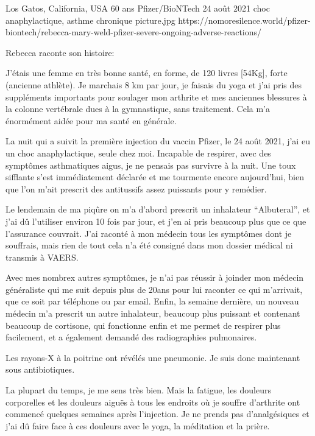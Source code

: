 {Los Gatos, California, USA}
{60 ans}
{Pfizer/BioNTech}
{24 août 2021}
{choc anaphylactique, asthme chronique}
{picture.jpg}
{https://nomoresilence.world/pfizer-biontech/rebecca-mary-weld-pfizer-severe-ongoing-adverse-reactions/}
{

\normalsize
  
Rebecca raconte son histoire:

J'étais une femme en très bonne santé, en forme, de 120 livres [54Kg], forte
(ancienne athlète). Je marchais 8 km par jour, je faisais du yoga et j'ai pris
des suppléments importants pour soulager mon arthrite et mes anciennes blessures
à la colonne vertébrale dues à la gymnastique, sans traitement. Cela m'a
énormément aidée pour ma santé en générale.

La nuit qui a suivit la première injection du vaccin Pfizer, le 24 août 2021,
j'ai eu un choc anaphylactique, seule chez moi. Incapable de respirer, avec des
symptômes asthmatiques aigus, je ne pensais pas survivre à la nuit. Une toux
sifflante s'est immédiatement déclarée et me tourmente encore aujourd'hui, bien
que l'on m'ait prescrit des antitussifs assez puissants pour y remédier.

Le lendemain de ma piqûre on m'a d'abord prescrit un inhalateur “Albuteral”, et
j'ai dû l'utiliser environ 10 fois par jour, et j'en ai pris beaucoup plus que
ce que l'assurance couvrait. J'ai raconté à mon médecin tous les symptômes dont
je souffrais, mais rien de tout cela n'a été consigné dans mon dossier médical
ni transmis à VAERS.

Avec mes nombrex autres symptômes, je n'ai pas réussir à joinder mon médecin
généraliste qui me suit depuis plus de 20ans pour lui raconter ce qui
m'arrivait, que ce soit par téléphone ou par email. Enfin, la semaine dernière,
un nouveau médecin m'a prescrit un autre inhalateur, beaucoup plus puissant et
contenant beaucoup de cortisone, qui fonctionne enfin et me permet de respirer
plus facilement, et a également demandé des radiographies pulmonaires.

Les rayons-X à la poitrine ont révélés une pneumonie. Je suis donc maintenant
sous antibiotiques.

La plupart du temps, je me sens très bien. Mais la fatigue, les douleurs
corporelles et les douleurs aiguës à tous les endroits où je souffre d'arthrite
ont commencé quelques semaines après l'injection. Je ne prends pas
d'analgésiques et j'ai dû faire face à ces douleurs avec le yoga, la méditation
et la prière.

}
